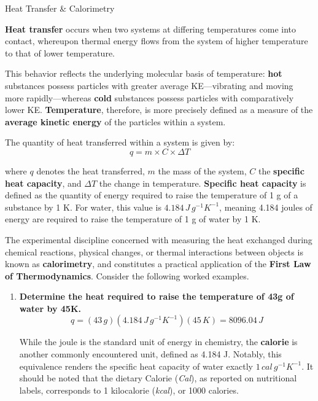 \documentclass[10pt]{article}
\begin{document}
    \begin{core}{Heat Transfer \& Calorimetry}

      \textbf{Heat transfer} occurs when two systems at differing temperatures come into contact, whereupon thermal energy flows from the system of higher temperature to that of lower temperature. 

      
      This behavior reflects the underlying molecular basis of temperature: \textbf{hot} substances possess particles with greater average KE---vibrating and moving more rapidly---whereas \textbf{cold} substances possess particles with comparatively lower KE. \textbf{Temperature}, therefore, is more precisely defined as a measure of the \textbf{average kinetic energy} of the particles within a system.

      The quantity of heat transferred within a system is given by:
      \[
        q = m \times C \times \Delta T
      \]

      where $q$ denotes the heat transferred, $m$ the mass of the system, $C$ the \textbf{specific heat capacity}, and $\Delta T$ the change in temperature. \textbf{Specific heat capacity} is defined as the quantity of energy required to raise the temperature of 1 g of a substance by 1 K. For water, this value is $4.184\, J\, g^{-1} K^{-1}$, meaning 4.184 joules of energy are required to raise the temperature of 1 g of water by 1 K.

      The experimental discipline concerned with measuring the heat exchanged during chemical reactions, physical changes, or thermal interactions between objects is known as \textbf{calorimetry}, and constitutes a practical application of the \textbf{First Law of Thermodynamics}. Consider the following worked examples.

      \begin{enumerate}

        \item \textbf{Determine the heat required to raise the temperature of 43g of water by 45K.}
        \[
          q = (43\, g)(4.184\, J\, g^{-1} K^{-1})(45\, K) = 8096.04\, J
        \]

        While the joule is the standard unit of energy in chemistry, the \textbf{calorie} is another commonly encountered unit, defined as 4.184 J. Notably, this equivalence renders the specific heat capacity of water exactly $1\, cal\, g^{-1} K^{-1}$. It should be noted that the dietary Calorie (\textit{Cal}), as reported on nutritional labels, corresponds to 1 kilocalorie (\textit{kcal}), or 1000 calories.


\end{enumerate}
\end{core}
\end{document}
